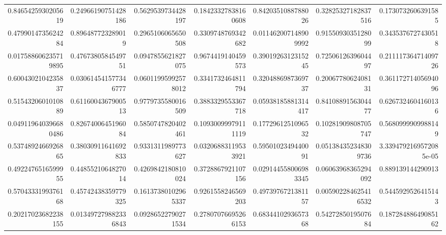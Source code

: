 \documentclass{standalone}
\begin{document}
\begin{tabular}{*{7}{R}}
0.8465425930205619 & 0.24966190751428186 & 0.5629539734428197 & 0.18423327838160608 & 0.8420351088788026 & 0.32825327182837516 & 0.1730732606391585 \\
0.4799014735624284 & 0.896487723289019 & 0.2965106065650508 & 0.3309748769342682 & 0.011462007148909992 & 0.9155093035128099 & 0.3435376727430518 \\
0.017588606235719895 & 0.4767380584549751 & 0.0947855621827075 & 0.9674419140459573 & 0.3901926312315245 & 0.7250612639604497 & 0.21111736471409726 \\
0.6004302104235837 & 0.030614541577346777 & 0.06011995992578012 & 0.3341732464811794 & 0.3204886987369737 & 0.2006778062408131 & 0.36117271405694096 \\
0.5154320601010889 & 0.6116004367900513 & 0.9779735580016509 & 0.3883329553367718 & 0.05938185881314417 & 0.8410889156304477 & 0.6267324604160136 \\
0.049119640396680486 & 0.8267400645196084 & 0.5850747820402461 & 0.10930099979111119 & 0.1772961251096532 & 0.10281909808705747 & 0.5680999909988149 \\
0.5374892466926865 & 0.38030911641692833 & 0.9331311989773627 & 0.03206883119533921 & 0.5950102349440091 & 0.051384352348309736 & 3.3394792169572085e-05 \\
0.4922476516599955 & 0.4485521064827014 & 0.4269842180810024 & 0.3728867921107156 & 0.029144558006983345 & 0.06063968365294092 & 0.889139144290913 \\
0.5704333199376168 & 0.45742438359779325 & 0.16137380102965337 & 0.9261558246569203 & 0.4973976721381157 & 0.005902284625416532 & 0.5445929526415143 \\
0.20217023682238155 & 0.013497279882336843 & 0.09286522790271534 & 0.27807076695266153 & 0.6834410293657368 & 0.5427285019507684 & 0.18728488649085162
\end{tabular}
\end{document}

